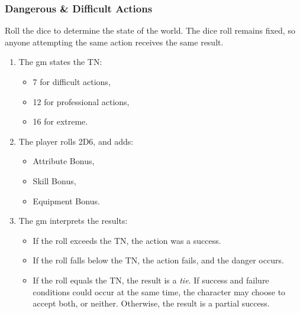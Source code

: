 \subsubsection*{Dangerous \& Difficult Actions}

Roll the dice to determine the state of the world.
The dice roll remains fixed, so anyone attempting the same action receives the same result.

\begin{enumerate}
  \item
  The \gls{gm} states the TN:

  \begin{itemize}
    \item
    7 for difficult actions,
    \item
    12 for professional actions,
    \item
    16 for extreme.
  \end{itemize}
  \item
  The player rolls 2D6, and adds:
  \begin{itemize}
    \item
    Attribute Bonus,
    \item
    Skill Bonus,
    \item
    Equipment Bonus.
  \end{itemize}
  \item
  The \gls{gm} interprets the results:
  \begin{itemize}
    \item
    If the roll exceeds the TN, the action was a success.
    \item
    If the roll falls below the TN, the action fails, and the danger occurs.
    \item
    If the roll equals the TN, the result is a \emph{tie}.
    If success and failure conditions could occur at the same time, the character may choose to accept both, or neither.
    Otherwise, the result is a partial success.
    \end{itemize}
\end{enumerate}
